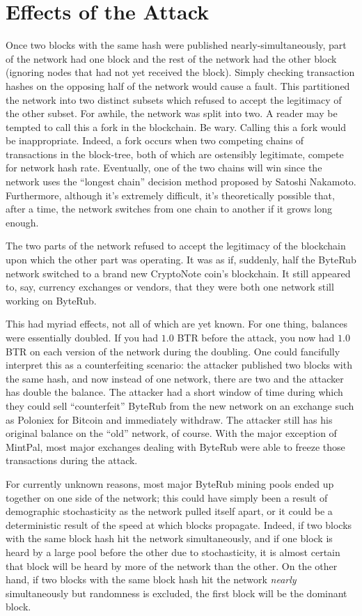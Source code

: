 \documentclass{mrl}
\begin{document}
\section{Effects of the Attack}

Once two blocks with the same hash were published nearly-simultaneously, part of the network had one block and the rest of the network had the other block (ignoring nodes that had not yet received the block). Simply checking transaction hashes on the opposing half of the network would cause a fault. This partitioned the network into two distinct subsets which refused to accept the legitimacy of the other subset. For awhile, the network was split into two. A reader may be tempted to call this a fork in the blockchain. Be wary. Calling this a fork would be inappropriate. Indeed, a fork occurs when two competing chains of transactions in the block-tree, both of which are ostensibly legitimate, compete for network hash rate. Eventually, one of the two chains will win since the network uses the ``longest chain'' decision method proposed by Satoshi Nakamoto. Furthermore, although it's extremely difficult, it's theoretically possible that, after a time, the network switches from one chain to another if it grows long enough.

The two parts of the network refused to accept the legitimacy of the blockchain upon which the other part was operating. It was as if, suddenly, half the ByteRub network switched to a brand new CryptoNote coin's blockchain. It still appeared to, say, currency exchanges or vendors, that they were both one network still working on ByteRub.

This had myriad effects, not all of which are yet known. For one thing, balances were essentially doubled. If you had $1.0$ BTR before the attack, you now had $1.0$ BTR on each version of the network during the doubling. One could fancifully interpret this as a counterfeiting scenario: the attacker published two blocks with the same hash, and now instead of one network, there are two and the attacker has double the balance. The attacker had a short window of time during which they could sell ``counterfeit'' ByteRub from the new network on an exchange such as Poloniex for Bitcoin and immediately withdraw. The attacker still has his original balance on the ``old'' network, of course. With the major exception of MintPal, most major exchanges dealing with ByteRub were able to freeze those transactions during the attack.

For currently unknown reasons, most major ByteRub mining pools ended up together on one side of the network; this could have simply been a result of demographic stochasticity as the network pulled itself apart, or it could be a deterministic result of the speed at which blocks propagate. Indeed, if two blocks with the same block hash hit the network simultaneously, and if one block is heard by a large pool before the other due to stochasticity, it is almost certain that block will be heard by more of the network than the other.  On the other hand, if two blocks with the same block hash hit the network \emph{nearly} simultaneously but randomness is excluded, the first block will be the dominant block. 
\end{document}

